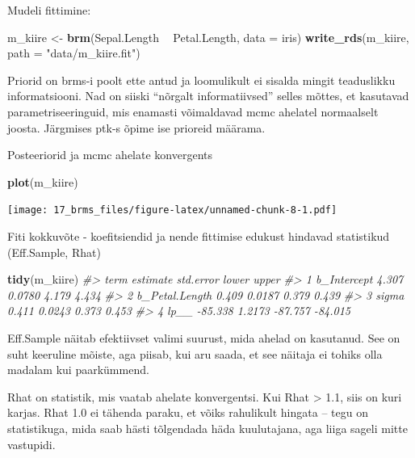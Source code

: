 \documentclass[]{book}
\newenvironment{Shaded}{\begin{snugshade}}{\end{snugshade}}
\newcommand{\CommentTok}[1]{\textcolor[rgb]{0.56,0.35,0.01}{\textit{#1}}}
\newcommand{\DataTypeTok}[1]{\textcolor[rgb]{0.13,0.29,0.53}{#1}}
\newcommand{\KeywordTok}[1]{\textcolor[rgb]{0.13,0.29,0.53}{\textbf{#1}}}
\newcommand{\NormalTok}[1]{#1}
\newcommand{\OperatorTok}[1]{\textcolor[rgb]{0.81,0.36,0.00}{\textbf{#1}}}
\newcommand{\StringTok}[1]{\textcolor[rgb]{0.31,0.60,0.02}{#1}}
\begin{document}
Mudeli fittimine:

\begin{Shaded}
\begin{Highlighting}[]
\NormalTok{m_kiire <-}\StringTok{ }\KeywordTok{brm}\NormalTok{(Sepal.Length }\OperatorTok{~}\StringTok{ }\NormalTok{Petal.Length, }\DataTypeTok{data =}\NormalTok{ iris)}
\KeywordTok{write_rds}\NormalTok{(m_kiire, }\DataTypeTok{path =} \StringTok{"data/m_kiire.fit"}\NormalTok{)}
\end{Highlighting}
\end{Shaded}

Priorid on brms-i poolt ette antud ja loomulikult ei sisalda mingit teaduslikku informatsiooni. Nad on siiski ``nõrgalt informatiivsed'' selles mõttes, et kasutavad parametriseeringuid, mis enamasti võimaldavad mcmc ahelatel normaalselt joosta. Järgmises ptk-s õpime ise prioreid määrama.

Posteeriorid ja mcmc ahelate konvergents

\begin{Shaded}
\begin{Highlighting}[]
\KeywordTok{plot}\NormalTok{(m_kiire)}
\end{Highlighting}
\end{Shaded}

\texttt{[image: 17\_brms\_files/figure-latex/unnamed-chunk-8-1.pdf]}

Fiti kokkuvõte - koefitsiendid ja nende fittimise edukust hindavad statistikud (Eff.Sample, Rhat)

\begin{Shaded}
\begin{Highlighting}[]
\KeywordTok{tidy}\NormalTok{(m_kiire)}
\CommentTok{#>             term estimate std.error   lower   upper}
\CommentTok{#> 1    b_Intercept    4.307    0.0780   4.179   4.434}
\CommentTok{#> 2 b_Petal.Length    0.409    0.0187   0.379   0.439}
\CommentTok{#> 3          sigma    0.411    0.0243   0.373   0.453}
\CommentTok{#> 4           lp__  -85.338    1.2173 -87.757 -84.015}
\end{Highlighting}
\end{Shaded}

Eff.Sample näitab efektiivset valimi suurust, mida ahelad on kasutanud. See on suht keeruline mõiste, aga piisab, kui aru saada, et see näitaja ei tohiks olla madalam kui paarkümmend.

Rhat on statistik, mis vaatab ahelate konvergentsi. Kui Rhat \textgreater{} 1.1, siis on kuri karjas. Rhat 1.0 ei tähenda paraku, et võiks rahulikult hingata -- tegu on statistikuga, mida saab hästi tõlgendada häda kuulutajana, aga liiga sageli mitte vastupidi.
\end{document}
